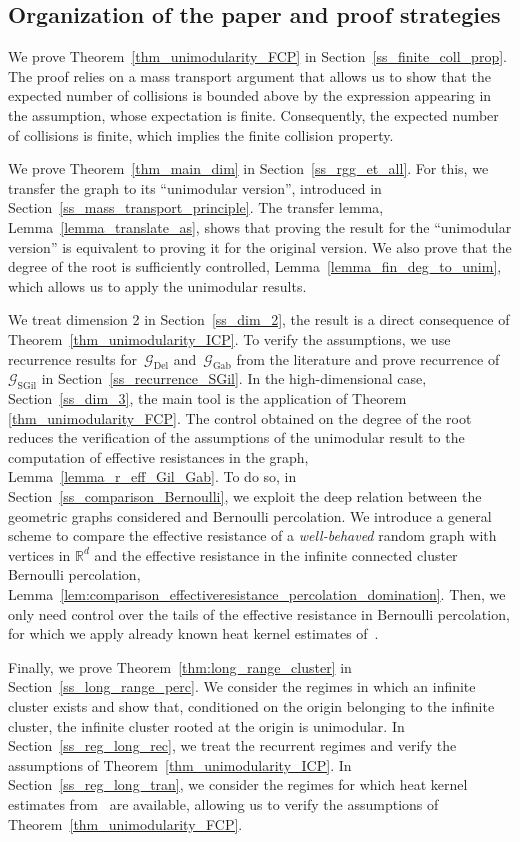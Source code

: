 \documentclass[a4paper,11pt]{article}
\theoremstyle{definition}
\begin{document}
\subsection{Organization of the paper and proof strategies}
We prove Theorem~\ref{thm_unimodularity_FCP} in Section~\ref{ss_finite_coll_prop}. The proof relies on a mass transport argument that allows us to show that the expected number of collisions is bounded above by the expression appearing in the assumption, whose expectation is finite. Consequently, the expected number of collisions is finite, which implies the finite collision property.

We prove Theorem~\ref{thm_main_dim} in Section~\ref{ss_rgg_et_all}. For this, we transfer the graph to its ``unimodular version'', introduced in Section~\ref{ss_mass_transport_principle}. The transfer lemma, Lemma~\ref{lemma_translate_as}, shows that proving the result for the ``unimodular version'' is equivalent to proving it for the original version. We also prove that the degree of the root is sufficiently controlled, Lemma~\ref{lemma_fin_deg_to_unim}, which allows us to apply the unimodular results. 

We treat dimension 2 in Section~\ref{ss_dim_2}, the result is a direct consequence of Theorem~\ref{thm_unimodularity_ICP}. To verify the assumptions, we use recurrence results for~$\mathcal G_\mathrm{Del}$ and~$\mathcal G_\mathrm{Gab}$ from the literature and prove recurrence of~$\mathcal G_\mathrm{SGil}$ in Section~\ref{ss_recurrence_SGil}. In the high-dimensional case, Section~\ref{ss_dim_3}, the main tool is the application of Theorem \ref{thm_unimodularity_FCP}. The control obtained on the degree of the root reduces the verification of the assumptions of the unimodular result to the computation of effective resistances in the graph, Lemma~\ref{lemma_r_eff_Gil_Gab}. To do so, in Section~\ref{ss_comparison_Bernoulli}, we exploit the deep relation between the geometric graphs considered and Bernoulli percolation. We introduce a general scheme to compare the effective resistance of a \textit{well-behaved} random graph with vertices in $\mathbb R^d$ and the effective resistance in the infinite connected cluster Bernoulli percolation, Lemma~\ref{lem:comparison_effectiveresistance_percolation_domination}. Then, we only need control over the tails of the effective resistance in Bernoulli percolation, for which we apply already known heat kernel estimates of~\cite{barlow2004random}. 

Finally, we prove Theorem~\ref{thm:long_range_cluster} in Section~\ref{ss_long_range_perc}. We consider the regimes in which an infinite cluster exists and show that, conditioned on the origin belonging to the infinite cluster, the infinite cluster rooted at the origin is unimodular. In Section~\ref{ss_reg_long_rec}, we treat the recurrent regimes and verify the assumptions of Theorem~\ref{thm_unimodularity_ICP}. In Section~\ref{ss_reg_long_tran}, we consider the regimes for which heat kernel estimates from~\cite{Sly12} are available, allowing us to verify the assumptions of Theorem~\ref{thm_unimodularity_FCP}.
\end{document}
